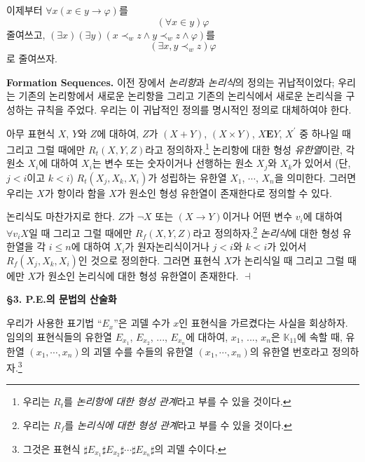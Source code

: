 \documentclass[12pt]{paper}
\newenvironment{context}[1][]
{ \noindent \textbf{{#1}.} }
{ \hfill $ \dashv $ }
\begin{document}
이제부터 $ \forall x \left( x \in y \rightarrow \varphi \right) $를 $$ \left( \forall x \in y \right) \varphi $$ 줄여쓰고,
$ \left( \exists x \right) \left( \exists y \right) \left( x \prec_{w} z \land y \prec_{w} z \land \varphi \right) $를 $$\left( \exists x , y \prec_{w} z \right) \varphi$$로 줄여쓰자.

\begin{context}[Formation Sequences]
이전 장에서 \textit{논리항}과 \textit{논리식}의 정의는 귀납적이었다;
우리는 기존의 논리항에서 새로운 논리항을 그리고 기존의 논리식에서 새로운 논리식을 구성하는 규칙을 주었다.
우리는 이 귀납적인 정의를 명시적인 정의로 대체하여야 한다.

아무 표현식 $X$, $Y$와 $Z$에 대하여,
$Z$가 $\left( X + Y \right)$, $\left( X \times Y \right)$, $X \mathbf{E} Y$, $X^{\prime}$ 중 하나일 때 그리고 그럴 때에만
$R_t \left( X , Y , Z \right)$라고 정의하자.\footnote
{
우리는 $R_t$를 \textit{논리항에 대한 형성 관계}라고 부를 수 있을 것이다.
}
논리항에 대한 형성 \textit{유한열}이란, 각 원소 $X_{i}$에 대하여 $X_{i}$는 변수 또는 숫자이거나 선행하는 원소 $X_{j}$와 $X_{k}$가 있어서 (단, $j < i$이고 $k < i$) $R_t \left( X_{j}, X_{k}, X_{i} \right)$가 성립하는 유한열 $X_1$, $\cdots$, $X_n$을 의미한다.
그러면 우리는 $X$가 항이라 함을 $X$가 원소인 형성 유한열이 존재한다로 정의할 수 있다.

논리식도 마찬가지로 한다. $Z$가 $\lnot X$ 또는 $\left( X \to Y \right)$이거나 어떤 변수 $v_{i}$에 대하여 $\forall v_{i} X$일 때 그리고 그럴 때에만
$R_f \left( X , Y , Z \right)$라고 정의하자.\footnote
{
우리는 $R_f$를 \textit{논리식에 대한 형성 관계}라고 부를 수 있을 것이다.
}
\textit{논리식}에 대한 형성 유한열을 각 $i \le n$에 대하여 $X_{i}$가 원자논리식이거나 $j < i$와 $k < i$가 있어서 $R_f \left( X_{j} , X_{k} , X_{i} \right)$인 것으로 정의한다.
그러면 표현식 $X$가 논리식일 때 그리고 그럴 때에만 $X$가 원소인 논리식에 대한 형성 유한열이 존재한다.
\end{context}

\noindent \textbf{\S3. P.E.의 문법의 산술화}

우리가 사용한 표기법 ``$E_{x}$''은 괴델 수가 $x$인 표현식을 가르켰다는 사실을 회상하자.
임의의 표현식들의 유한열 $E_{x_1}$, $E_{x_2}$, ..., $E_{x_n}$에 대하여, $x_1$, ..., $x_n$은 $\mathbb{K}_{11}$에 속할 때,
유한열 $\left( x_{1}, \cdots, x_{n} \right)$의 괴델 수를 수들의 유한열 $\left( x_{1}, \cdots, x_{n} \right)$의 유한열 번호라고 정의하자.\footnote
{
그것은 표현식 $\sharp E_{x_1} \sharp E_{x_2} \sharp \cdots \sharp E_{x_n} \sharp$의 괴델 수이다.
}
\end{document}
